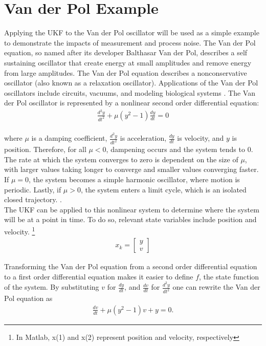 \section{Van der Pol Example}
\label{Van der Pol Example}


Applying the UKF to the Van der Pol oscillator will be used as a simple example to demonstrate the impacts of measurement and process noise. The Van der Pol equation, so named after its developer Balthasar Van der Pol, describes a self sustaining oscillator that create energy at small amplitudes and remove energy from large amplitudes. The Van der Pol equation describes a nonconservative oscillator (also known as a relaxation oscillator). Applications of the Van der Pol oscillators include circuits, vacuums, and modeling biological systems
 \cite{weisstein_2019}. The Van der Pol oscillator is represented by a nonlinear second order differential equation: 
\begin{align*}
\frac{d^2y}{dt^2} + \mu(y^2-1)\frac{dy}{dt} = 0
\end{align*}   \\
where $\mu$ is a damping coefficient, $\frac{d^2y}{dt^2}$ is acceleration, $\frac{dy}{dt}$ is velocity, and $y$ is position. Therefore, for all $\mu < 0$, dampening occurs and the system tends to 0. The rate at which the system converges to zero is dependent on the size of $\mu$, with larger values taking longer to converge and smaller values converging faster. If $\mu = 0$, the system becomes a simple harmonic oscillator, where motion is periodic. Lastly, if $\mu > 0$, the system enters a limit cycle, which is an isolated closed trajectory. \cite{kinoshita_2013}. \\ 

\noindent The UKF can be applied to this nonlinear system to determine where the system will be at a point in time. To do so, relevant state variables include position and velocity.  \footnote{In Matlab, x(1) and x(2) represent position and velocity, respectively}
\begin{align*}
x_k = \begin{bmatrix}
          y\\ 
          v
           \end{bmatrix}  
\end{align*}


\noindent Transforming the Van der Pol equation from a second order differential equation to a first order differential equation makes it easier to define $f$, the state function of the system. By substituting $v$ for $\frac{dy}{dt}$, and $ \frac{dv}{dt} $ for  $\frac{d^2y}{dt^2}$ one can rewrite the Van der Pol equation as 
  \begin{align*}
 	\frac{dv}{dt}  +\mu(y ^2-1)v + y = 0.
 \end{align*}


